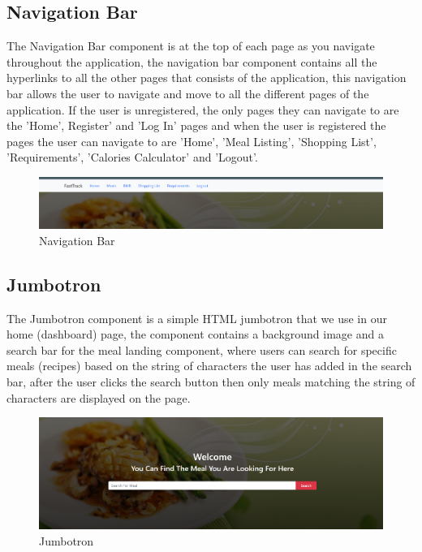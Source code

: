 \subsection{Navigation Bar}

The Navigation Bar component is at the top of each page as you navigate throughout the application, the navigation bar component contains all the hyperlinks to all the other pages that consists of the application, this navigation bar allows the user to navigate and move to all the different pages of the application. If the user is unregistered, the only pages they can navigate to are the 'Home', Register' and 'Log In' pages and when the user is registered the pages the user can navigate to are 'Home', 'Meal Listing', 'Shopping List', 'Requirements', 'Calories Calculator' and 'Logout'.

\begin{center}
  \begin{figure}[H]
    \includegraphics[width=\textwidth]{img/navbar.png}
    \caption{Navigation Bar}
    \label{fig: Image of Navigation Bar}
  \end{figure}
\end{center}

\subsection{Jumbotron}

The Jumbotron component is a simple HTML jumbotron that we use in our home (dashboard) page, the component contains a background image and a search bar for the meal landing component, where users can search for specific meals (recipes) based on the string of characters the user has added in the search bar, after the user clicks the search button then only meals matching the string of characters are displayed on the page.

\begin{center}
  \begin{figure}[H]
    \includegraphics[width=\textwidth]{img/jumbotron.png}
    \caption{Jumbotron}
    \label{fig: Image of Jumbotron}
  \end{figure}
\end{center}

